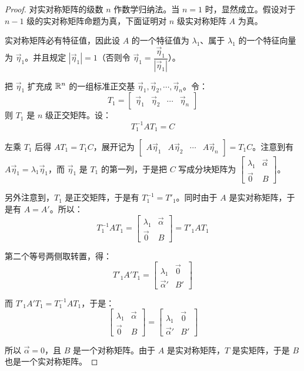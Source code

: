 \begin{proof}
	对实对称矩阵的级数 $n$ 作数学归纳法。当 $n = 1$ 时，显然成立。假设对于 $n - 1$ 级的实对称矩阵命题为真，下面证明对 $n$ 级实对称矩阵 $A$ 为真。

	实对称矩阵必有特征值，因此设 $A$ 的一个特征值为 $\lambda_1$、属于 $\lambda_1$ 的一个特征向量为 $\vec \eta_1$。并且规定 $|\vec \eta_1| = 1$（否则令 $\vec \eta_1 = \dfrac{\vec \eta_1}{|\vec \eta_1|}$）。

	把 $\vec \eta_1$ 扩充成 $\mathbb R^n$ 的一组标准正交基 $\vec \eta_1, \vec \eta_2, \cdots, \vec \eta_n$。令：
	$$
	T_1  = \begin{bmatrix} \vec \eta_1 & \vec \eta_2 & \cdots & \vec \eta_n \end{bmatrix}
	$$
	则 $T_1$ 是 $n$ 级正交矩阵。设：
	$$
	T_1^{-1} A T_1 = C
	$$

	左乘 $T_1$ 后得 $AT_1 = T_1 C$，展开记为 $\begin{bmatrix} A \vec \eta_1 & A \vec \eta_2 & \cdots & A \vec \eta_n \end{bmatrix} = T_1 C$。注意到有 $A\vec \eta_1 = \lambda_1 \vec \eta_1$，而 $\vec \eta_1$ 是 $T_1$ 的第一列，于是把 $C$ 写成分块矩阵为 $\begin{bmatrix} \lambda_1 & \vec \alpha \\ \vec 0 & B \end{bmatrix}$。

	另外注意到，$T_1$ 是正交矩阵，于是有 $T_1^{-1} = T'_1$。同时由于 $A$ 是实对称矩阵，于是有 $A = A'$。所以：
	$$
	T_1^{-1} A T_1 = \begin{bmatrix} \lambda_1 & \vec \alpha \\ \vec 0 & B \end{bmatrix} = T'_1 A T_1
	$$

	第二个等号两侧取转置，得：
	$$
	T'_1 A' T_1 = \begin{bmatrix} \lambda_1 & \vec 0 \\ \vec \alpha' & B' \end{bmatrix}
	$$

	而 $T'_1 A' T_1 = T_1^{-1} A T_1$，于是：
	$$
	\begin{bmatrix} \lambda_1 & \vec \alpha \\ \vec 0 & B \end{bmatrix} = \begin{bmatrix} \lambda_1 & \vec 0 \\ \vec \alpha' & B' \end{bmatrix}
	$$

	所以 $\vec \alpha = 0$，且 $B$ 是一个对称矩阵。由于 $A$ 是实对称矩阵，$T$ 是实矩阵，于是 $B$ 也是一个实对称矩阵。


\end{proof}
